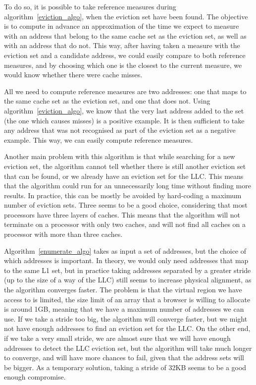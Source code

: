 \documentclass[a4paper,11pt,oneside]{report}
\begin{document}
To do so, it is possible to take reference measures during algorithm~\ref{eviction_algo}, when the eviction set have been found. The objective is to compute in advance an approximation of the time we expect to measure with an address that belong to the same cache set as the eviction set, as well as with an address that do not. This way, after having taken a measure with the eviction set and a candidate address, we could easily compare to both reference measures, and by choosing which one is the closest to the current measure, we would know whether there were cache misses.

All we need to compute reference measures are two addresses: one that maps to the same cache set as the eviction set, and one that does not. Using algorithm~\ref{eviction_algo}, we know that the very last address added to the set (the one which causes misses) is a positive example. It is then sufficient to take any address that was not recognised as part of the eviction set as a negative example. This way, we can easily compute reference measures.

Another main problem with this algorithm is that while searching for a new eviction set, the algorithm cannot tell whether there is still another eviction set that can be found, or we already have an eviction set for the LLC. This means that the algorithm could run for an unnecessarily long time without finding more results. In practice, this can be mostly be avoided by hard-coding a maximum number of eviction sets. Three seems to be a good choice, considering that most processors have three layers of caches. This means that the algorithm will not terminate on a processor with only two caches, and will not find all caches on a processor with more than three caches.

Algorithm~\ref{enumerate_algo} takes as input a set of addresses, but the choice of which addresses is important. In theory, we would only need addresses that map to the same L1 set, but in practice taking addresses separated by a greater stride (up to the size of a way of the LLC) still seems to increase physical alignment, as the algorithm converges faster. The problem is that the virtual region we have access to is limited, the size limit of an array that a browser is willing to allocate is around 1GB, meaning that we have a maximum number of addresses we can use. If we take a stride too big, the algorithm will converge faster, but we might not have enough addresses to find an eviction set for the LLC. On the other end, if we take a very small stride, we are almost sure that we will have enough addresses to detect the LLC eviction set, but the algorithm will take much longer to converge, and will have more chances to fail, given that the address sets will be bigger. As a temporary solution, taking a stride of 32KB seems to be a good enough compromise.
\end{document}
